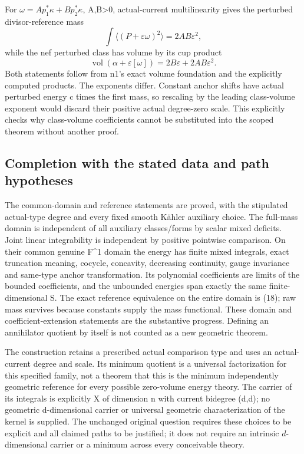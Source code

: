 \documentclass[
]{article}
\begin{document}
For \(\omega=A p_1^*\kappa+B p_2^*\kappa\), A,B\textgreater0,
actual-current multilinearity gives the perturbed divisor-reference mass
\[
\int\langle(P+\varepsilon\omega)^2\rangle
=2AB\varepsilon^2,
\] while the nef perturbed class has volume by its cup product \[
\operatorname{vol}(\alpha+\varepsilon[\omega])
=2B\varepsilon+2AB\varepsilon^2.
\] Both statements follow from n1's exact volume foundation and the
explicitly computed products. The exponents differ. Constant anchor
shifts have actual perturbed energy c times the first mass, so rescaling
by the leading class-volume exponent would discard their positive actual
degree-zero scale. This explicitly checks why class-volume coefficients
cannot be substituted into the scoped theorem without another proof.

\subsection{Completion with the stated data and path hypotheses}\label{what-is-proved-and-what-remains-for-the-original-atom}

The common-domain and reference statements are proved, with the stipulated actual-type degree and
every fixed smooth Kähler auxiliary choice. The full-mass domain is
independent of all auxiliary classes/forms by scalar mixed deficits.
Joint linear integrability is independent by positive pointwise
comparison. On their common genuine F\^{}1 domain the energy has finite
mixed integrals, exact truncation meaning, cocycle, concavity,
decreasing continuity, gauge invariance and same-type anchor
transformation. Its polynomial coefficients are limits of the bounded
coefficients, and the unbounded energies span exactly the same
finite-dimensional S. The exact reference equivalence on the entire
domain is (18); raw mass survives because constants supply the mass
functional. These domain and coefficient-extension statements are the
substantive progress. Defining an annihilator quotient by itself is not
counted as a new geometric theorem.

The construction retains a prescribed actual comparison type and uses an
actual-current degree and scale. Its minimum quotient is a universal
factorization for this specified family, not a theorem that this is the
minimum independently geometric reference for every possible zero-volume
energy theory. The carrier of its integrals is explicitly X of dimension
n with current bidegree (d,d); no geometric d-dimensional carrier or
universal geometric characterization of the kernel is supplied. The
unchanged original question requires these choices to be explicit and
all claimed paths to be justified; it does not require an intrinsic
\(d\)-dimensional carrier or a minimum across every conceivable theory.
\end{document}
